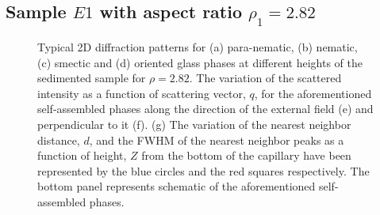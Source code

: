 \documentclass[aps,prl,preprint,superscriptaddress]{revtex4-1} %
\begin{document}
\subsection{Sample $E1$ with aspect ratio $\rho_1 = 2.82$}
\begin{figure}[t]
\caption{Typical 2D diffraction patterns for (a) para-nematic, (b) nematic, (c) smectic and (d) oriented glass phases at different heights of the sedimented sample for $\rho=2.82$. The variation of the scattered intensity as a function of scattering vector, $q$, for the aforementioned self-assembled phases along the direction of the external field (e) and perpendicular to it (f). (g) The variation of the nearest neighbor distance, $d$, and the FWHM of the nearest neighbor peaks as a function of height, $Z$ from the bottom of the capillary have been represented by the blue circles and the red squares respectively. The bottom panel represents schematic of the aforementioned self-assembled phases.}\label{z_scan}
\end{figure} 
\end{document}
